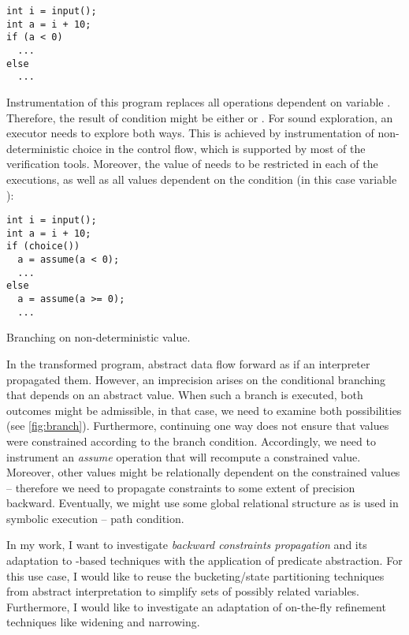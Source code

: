 \begin{marginfigure}
\begin{verbatim}
int i = input();
int a = i + 10;
if (a < 0)
  ...
else
  ...
\end{verbatim}

    \footnotesize
    Instrumentation of this program replaces all operations dependent on variable
    .  Therefore, the result of condition  might be
    either  or .  For sound exploration, an executor
    needs to explore both ways. This is achieved by instrumentation of
    non-deterministic choice in the control flow, which is supported by most of
    the verification tools. Moreover, the value of  needs to be
    restricted in each of the executions, as well as all values dependent on
    the condition (in this case variable ):
\begin{verbatim}
int i = input();
int a = i + 10;
if (choice())
  a = assume(a < 0);
  ...
else
  a = assume(a >= 0);
  ...
\end{verbatim}

\caption{Branching on non-deterministic value.}
\label{fig:branch}
\end{marginfigure}

In the transformed program, abstract data flow forward as if an interpreter
propagated them. However, an imprecision arises on the conditional branching
that depends on an abstract value. When such a branch is executed, both
outcomes might be admissible, in that case, we need to examine both
possibilities (see \autoref{fig:branch}).
Furthermore, continuing one way does not ensure that values were constrained
according to the branch condition. Accordingly, we need to instrument an
\emph{assume} operation that will recompute a constrained value. Moreover,
other values might be relationally dependent on the constrained values --
therefore we need to propagate constraints to some extent of precision
backward. Eventually, we might use some global relational structure as is used
in symbolic execution -- path condition.

In my work, I want to investigate \emph{backward constraints propagation} and
its adaptation to \cegar-based techniques with the application of predicate
abstraction. For this use case, I would like to reuse the bucketing/state
partitioning techniques from abstract interpretation to simplify sets of
possibly related variables. Furthermore, I would like to investigate an
adaptation of on-the-fly refinement techniques like widening and narrowing.

